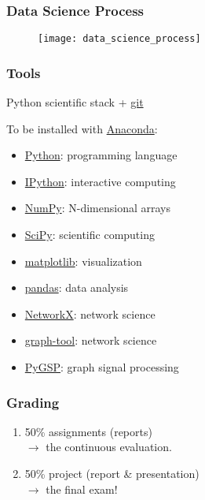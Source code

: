 \documentclass{beamer}
\begin{document}

\begin{frame}
	\frametitle{Data Science Process}
	\begin{figure}
		\texttt{[image: data\_science\_process]}
	\end{figure}
\end{frame}


\begin{frame}
	\frametitle{Tools}
	\begin{center}
		Python scientific stack + \href{https://git-scm.com}{git}
	\end{center}
	\vfill
	To be installed with \href{https://www.anaconda.com/download}{Anaconda}:
	\begin{itemize}
		\item \href{https://www.python.org}{Python}: programming language
		\item \href{https://ipython.org}{IPython}: interactive computing
		\item \href{http://www.numpy.org}{NumPy}: N-dimensional arrays
		\item \href{https://www.scipy.org/scipylib/index.html}{SciPy}: scientific computing
		\item \href{https://matplotlib.org}{matplotlib}: visualization
		\item \href{https://pandas.pydata.org}{pandas}: data analysis
		\item \href{https://networkx.github.io}{NetworkX}: network science
		\item \href{https://graph-tool.skewed.de}{graph-tool}: network science
		\item \href{https://github.com/epfl-lts2/pygsp}{PyGSP}: graph signal processing
	\end{itemize}
\end{frame}


\begin{frame}
	\frametitle{Grading}
	\begin{enumerate}
		\item 50\% assignments (reports) \\
		$\rightarrow$ the continuous evaluation.
		\vspace{2em}
		\item 50\% project (report \& presentation) \\
		$\rightarrow$ the final exam!
	\end{enumerate}
\end{frame}
\end{document}
